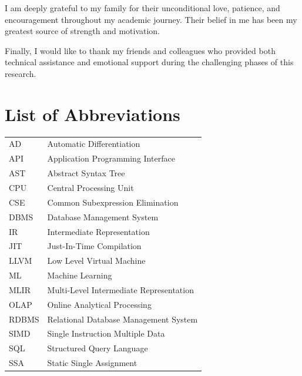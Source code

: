 \documentclass[12pt]{report}
\begin{document}
I am deeply grateful to my family for their unconditional love, patience, and encouragement throughout my academic journey. Their belief in me has been my greatest source of strength and motivation.

Finally, I would like to thank my friends and colleagues who provided both technical assistance and emotional support during the challenging phases of this research.

\newpage



\tableofcontents
\newpage


\listoffigures
{}

\newpage


\listoftables
{}

\newpage


\chapter*{List of Abbreviations}


\begin{tabular}{ll}
AD    & Automatic Differentiation \\
API   & Application Programming Interface \\
AST   & Abstract Syntax Tree \\
CPU   & Central Processing Unit \\
CSE   & Common Subexpression Elimination \\
DBMS  & Database Management System \\
IR    & Intermediate Representation \\
JIT   & Just-In-Time Compilation \\
LLVM  & Low Level Virtual Machine \\
ML    & Machine Learning \\
MLIR  & Multi-Level Intermediate Representation \\
OLAP  & Online Analytical Processing \\
RDBMS & Relational Database Management System \\
SIMD  & Single Instruction Multiple Data \\
SQL   & Structured Query Language \\
SSA   & Static Single Assignment \\
\end{tabular}
\end{document}
